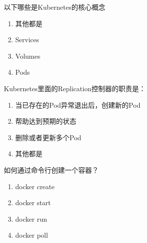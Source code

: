 \begin{problem}
	以下哪些是Kubernetes的核心概念
    \vspace{-0.8em}
    \begin{multicols}{4}
        \begin{enumerate}[label=\Alph*.]
            \item 其他都是
            \item Services
            \item Volumes
            \item Pods
        \end{enumerate}
    \end{multicols}
    \vspace{-1em}
\end{problem}



\begin{problem}
    Kubernetes里面的Replication控制器的职责是：
    \vspace{-0.8em}
    \begin{multicols}{2}
        \begin{enumerate}[label=\Alph*.]
            \item 当已存在的Pod异常退出后，创建新的Pod
            \item 帮助达到预期的状态
            \item 删除或者更新多个Pod
            \item 其他都是
        \end{enumerate}
    \end{multicols}
    \vspace{-1em}
\end{problem}



\begin{problem}
	如何通过命令行创建一个容器？
    \vspace{-0.8em}
    \begin{multicols}{4}
        \begin{enumerate}[label=\Alph*.]
            \item docker create
            \item docker start
            \item docker run
            \item docker poll
        \end{enumerate}
    \end{multicols}
    \vspace{-1em}
\end{problem}



